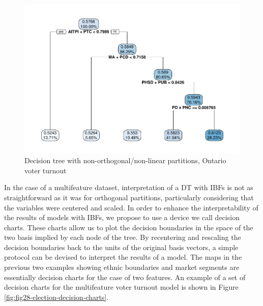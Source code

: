 \documentclass[]{elsarticle} %
\makeatletter
\def\maxwidth{\ifdim\Gin@nat@width>\linewidth\linewidth
\else\Gin@nat@width\fi}
\let\Oldincludegraphics\includegraphics
\renewcommand{\includegraphics}[1]{\Oldincludegraphics[width=\maxwidth]{#1}}
\makeatother
\begin{document}
\begin{figure}[htbp]
\centering
\includegraphics{Trees_with_Base_Functions_v2_files/figure-latex/fig27-tree-basis-election-1.pdf}
\caption{\label{fig:fig27-tree-basis-election}Decision tree with
non-orthogonal/non-linear partitions, Ontario voter turnout}
\end{figure}

In the case of a multifeature dataset, interpretation of a DT with IBFs
is not as straightforward as it was for orthogonal partitions,
particularly considering that the variables were centered and scaled. In
order to enhance the interpretability of the results of models with
IBFs, we propose to use a device we call decision charts. These charts
allow us to plot the decision boundaries in the space of the two basis
implied by each node of the tree. By recentering and rescaling the
decision boundaries back to the units of the original basis vectors, a
simple protocol can be devised to interpret the results of a model. The
maps in the previous two examples showing ethnic boundaries and market
segments are essentially decision charts for the case of two features.
An example of a set of decision charts for the multifeature voter
turnout model is shown in Figure
\ref{fig:fig28-election-decision-charts}.
\end{document}
